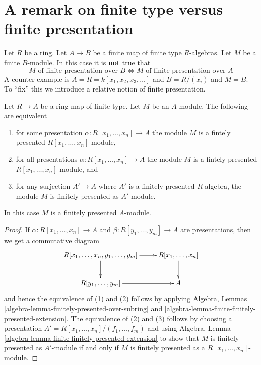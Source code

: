 \section{A remark on finite type versus finite presentation}
\label{section-finite-type-finite-presentation}

\noindent
Let $R$ be a ring. Let $A \to B$ be a finite map of finite type $R$-algebras.
Let $M$ be a finite $B$-module. In this case it is {\bf not} true that
$$
M\text{ of finite presentation over }B
\Leftrightarrow
M\text{ of finite presentation over }A
$$
A counter example is $A = R = k[x_1, x_2, x_3, \ldots]$ and $B = R/(x_i)$
and $M = B$. To ``fix'' this we introduce a relative notion of finite
presentation.

\begin{lemma}
\label{lemma-relatively-finitely-presented}
Let $R \to A$ be a ring map of finite type.
Let $M$ be an $A$-module.
The following are equivalent
\begin{enumerate}
\item for some presentation $\alpha : R[x_1, \ldots, x_n] \to A$
the module $M$ is a fintely presented $R[x_1, \ldots, x_n]$-module,
\item for all presentations $\alpha : R[x_1, \ldots, x_n] \to A$
the module $M$ is a fintely presented $R[x_1, \ldots, x_n]$-module, and
\item for any surjection $A' \to A$ where $A'$ is a finitely presented
$R$-algebra, the module $M$ is finitely presented as $A'$-module.
\end{enumerate}
In this case $M$ is a finitely presented $A$-module.
\end{lemma}

\begin{proof}
If $\alpha : R[x_1, \ldots, x_n] \to A$ and
$\beta : R[y_1, \ldots, y_m] \to A$ are presentations, then we get a
commutative diagram
$$
\xymatrix{
R[x_1, \ldots, x_n, y_1, \ldots, y_m] \ar[d] \ar[r] &
R[x_1, \ldots, x_n] \ar[d] \\
R[y_1, \ldots, y_m] \ar[r] & A
}
$$
and hence the equivalence of (1) and (2) follows by applying
Algebra, Lemmas \ref{algebra-lemma-finitely-presented-over-subring} and
\ref{algebra-lemma-finite-finitely-presented-extension}.
The equivalence of (2) and (3) follows by choosing a presentation
$A' = R[x_1, \ldots, x_n]/(f_1, \ldots, f_m)$ and using
Algebra, Lemma \ref{algebra-lemma-finite-finitely-presented-extension}
to show that $M$ is finitely presented as $A'$-module if and only if
$M$ is finitely presented as a $R[x_1, \ldots, x_n]$-module.
\end{proof}

